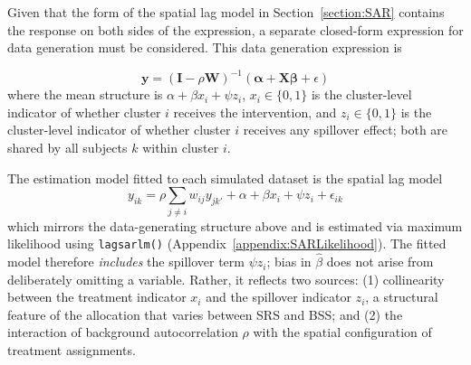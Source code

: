 \documentclass{article}[11pt]
\begin{document}
Given that the form of the spatial lag model in Section~\ref{section:SAR} contains the response on both sides of the expression, a separate closed-form expression for data generation must be considered\cite{fotheringham_sage_2009}\cite{baltagi_spatial_2003}. This data generation expression is

\begin{equation}\label{Equation:DataGen}
    \mathbf{y} = \left(\mathbf{I}-\rho \mathbf{W}\right)^{-1}\left(\boldsymbol\alpha + \mathbf{X}\boldsymbol\beta + \epsilon\right)
\end{equation}
where the mean structure is $\alpha + \beta x_i + \psi z_i$, $x_i \in \{0,1\}$ is the cluster-level indicator of whether cluster $i$ receives the intervention, and $z_i \in \{0,1\}$ is the cluster-level indicator of whether cluster $i$ receives any spillover effect; both are shared by all subjects $k$ within cluster $i$.

The estimation model fitted to each simulated dataset is the spatial lag model
\begin{equation}\label{Equation:EstModel}
    y_{ik} = \rho\sum_{j \neq i}w_{ij}y_{jk'} + \alpha + \beta x_i + \psi z_i + \epsilon_{ik}
\end{equation}
which mirrors the data-generating structure above and is estimated via maximum likelihood using \texttt{lagsarlm()} (Appendix~\ref{appendix:SARLikelihood}). The fitted model therefore \emph{includes} the spillover term $\psi z_i$; bias in $\hat{\beta}$ does not arise from deliberately omitting a variable. Rather, it reflects two sources: (1) collinearity between the treatment indicator $x_i$ and the spillover indicator $z_i$, a structural feature of the allocation that varies between SRS and BSS; and (2) the interaction of background autocorrelation $\rho$ with the spatial configuration of treatment assignments.
\end{document}
